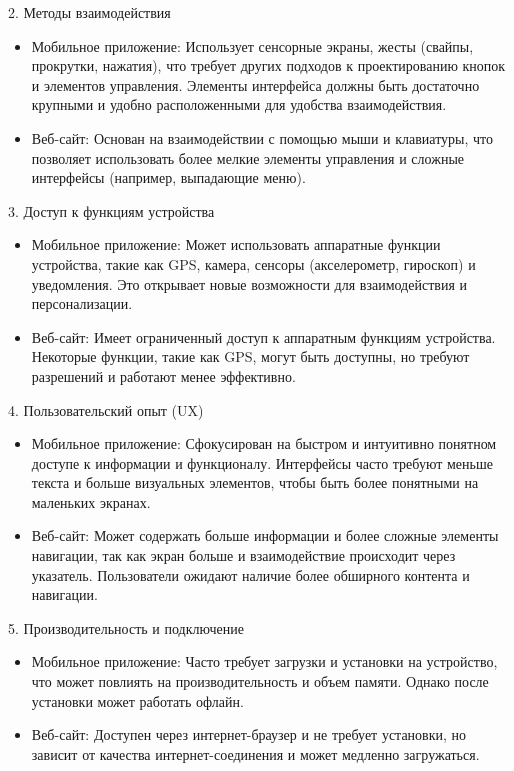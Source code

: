2. Методы взаимодействия

\begin{itemize}
    \item Мобильное приложение: Использует сенсорные экраны, жесты (свайпы, прокрутки, нажатия), что требует других подходов к проектированию кнопок и элементов управления. Элементы интерфейса должны быть достаточно крупными и удобно расположенными для удобства взаимодействия.
    \item Веб-сайт: Основан на взаимодействии с помощью мыши и клавиатуры, что позволяет использовать более мелкие элементы управления и сложные интерфейсы (например, выпадающие меню).
\end{itemize}

3. Доступ к функциям устройства

\begin{itemize}
    \item Мобильное приложение: Может использовать аппаратные функции устройства, такие как GPS, камера, сенсоры (акселерометр, гироскоп) и уведомления. Это открывает новые возможности для взаимодействия и персонализации.
    \item Веб-сайт: Имеет ограниченный доступ к аппаратным функциям устройства. Некоторые функции, такие как GPS, могут быть доступны, но требуют разрешений и работают менее эффективно.
\end{itemize}

4. Пользовательский опыт (UX)

\begin{itemize}
    \item Мобильное приложение: Сфокусирован на быстром и интуитивно понятном доступе к информации и функционалу. Интерфейсы часто требуют меньше текста и больше визуальных элементов, чтобы быть более понятными на маленьких экранах.
    \item Веб-сайт: Может содержать больше информации и более сложные элементы навигации, так как экран больше и взаимодействие происходит через указатель. Пользователи ожидают наличие более обширного контента и навигации.
\end{itemize}

5. Производительность и подключение

\begin{itemize}
    \item Мобильное приложение: Часто требует загрузки и установки на устройство, что может повлиять на производительность и объем памяти. Однако после установки может работать офлайн.
    \item Веб-сайт: Доступен через интернет-браузер и не требует установки, но зависит от качества интернет-соединения и может медленно загружаться.
\end{itemize}

